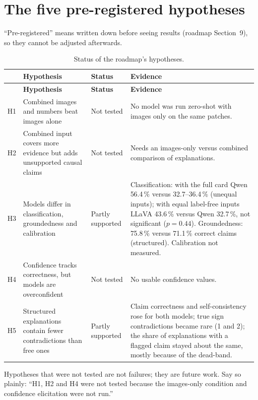 \section{The five pre-registered hypotheses}

``Pre-registered'' means written down before seeing results (roadmap Section~9), so they cannot be adjusted afterwards.

\begin{longtable}{L{0.8cm}L{4.4cm}L{2.3cm}L{6.6cm}}
\caption{Status of the roadmap's hypotheses.}\label{tab:hyp}\\
\toprule
 & \textbf{Hypothesis} & \textbf{Status} & \textbf{Evidence} \\
\midrule
\endfirsthead
\toprule
 & \textbf{Hypothesis} & \textbf{Status} & \textbf{Evidence} \\
\midrule
\endhead
H1 & Combined images and numbers beat images alone & Not tested & No model was run zero-shot with images only on the same patches. \\
H2 & Combined input covers more evidence but adds unsupported causal claims & Not tested & Needs an images-only versus combined comparison of explanations. \\
H3 & Models differ in classification, groundedness and calibration & Partly supported & Classification: with the full card Qwen 56.4\,\% versus 32.7--36.4\,\% (unequal inputs); with equal label-free inputs LLaVA 43.6\,\% versus Qwen 32.7\,\%, not significant ($p = 0.44$). Groundedness: 75.8\,\% versus 71.1\,\% correct claims (structured). Calibration not measured. \\
H4 & Confidence tracks correctness, but models are overconfident & Not tested & No usable confidence values. \\
H5 & Structured explanations contain fewer contradictions than free ones & Partly supported & Claim correctness and self-consistency rose for both models; true sign contradictions became rare (1 and 2); the share of explanations with a flagged claim stayed about the same, mostly because of the dead-band. \\
\bottomrule
\end{longtable}

\begin{foryourreport}
Hypotheses that were not tested are not failures; they are future work. Say so plainly: ``H1, H2 and H4 were not tested because the images-only condition and confidence elicitation were not run.''
\end{foryourreport}

